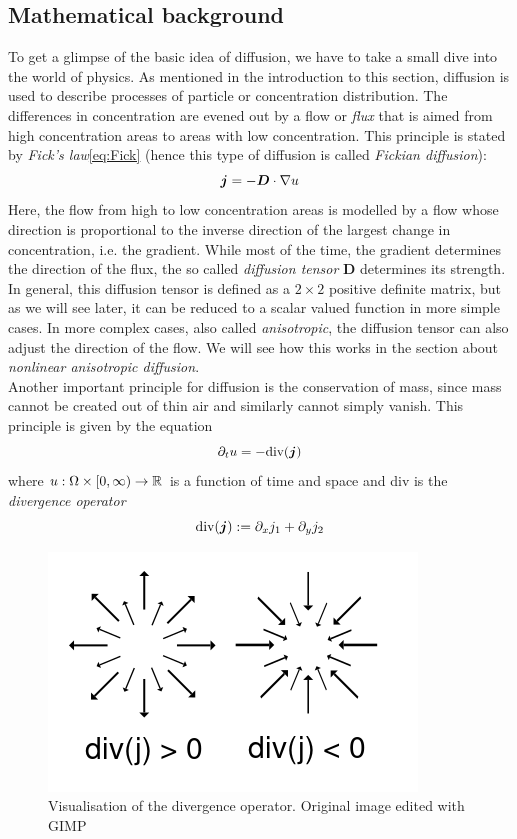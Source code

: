 \subsection{Mathematical background}
To get a glimpse of the basic idea of diffusion, we have to take a small dive into the world of
physics.
As mentioned in the introduction to this section, diffusion is used to describe processes of
particle or concentration distribution. The differences in concentration are evened out by a flow
or \textit{flux} that is aimed from high concentration areas to areas with low concentration. This
principle is stated by \textit{Fick's law}\eqref{eq:Fick} (hence this type of diffusion is called \textit{Fickian
diffusion}):
\begin{equation}
    \boldsymbol j = -\boldsymbol D\cdot\mathbf{\nabla} u\label{eq:Fick}
\end{equation}
Here, the flow from high to low concentration areas is modelled by a flow whose direction is
proportional to the inverse direction of the largest change in concentration, i.e. the gradient.
While most of the time, the gradient determines the direction of the flux, the so called
\textit{diffusion tensor} $\boldsymbol D$ determines its strength. In general, this diffusion
tensor is defined as a
$2\times2$ positive definite matrix, but as we will see later, it can be reduced to a scalar 
valued function in more simple cases.
In more complex cases, also called \textit{anisotropic}, the diffusion tensor can also adjust the
direction of the flow. We will see how this works in the section about \textit{nonlinear
anisotropic diffusion}.\\
Another important principle for diffusion is the conservation of mass, since mass cannot be created
out of thin air and similarly cannot simply vanish.
This principle is given by the equation
\begin{equation}
    \partial_t u = - \textnormal{div}(\boldsymbol j)\label{eq:Conservation}
\end{equation}
where $u: \Omega \times [0, \infty) \rightarrow \mathbb{R}$ is a function of time and space and div
is the \textit{divergence operator}
\[\textnormal{div}(\boldsymbol j) := \partial_x j_1 + \partial_y j_2\]
\begin{figure}[h]
    \centering
    \includegraphics[width=0.5\linewidth]{../Images/divergence2.png}
    \caption{Visualisation of the divergence operator. Original image \cite{img-divergence}
    edited with GIMP}\label{fig:Divergence}
\end{figure}
